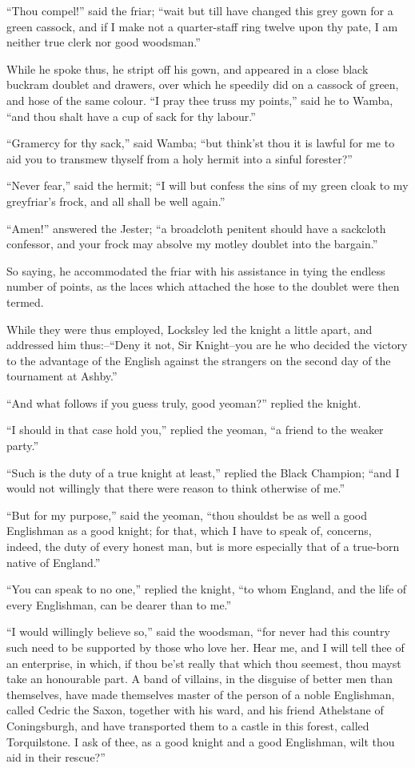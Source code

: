 ``Thou compel!'' said the friar; ``wait but till have changed this grey
gown for a green cassock, and if I make not a quarter-staff ring twelve
upon thy pate, I am neither true clerk nor good woodsman.''

While he spoke thus, he stript off his gown, and appeared in a close
black buckram doublet and drawers, over which he speedily did on a
cassock of green, and hose of the same colour. ``I pray thee truss my
points,'' said he to Wamba, ``and thou shalt have a cup of sack for thy
labour.''

``Gramercy for thy sack,'' said Wamba; ``but think'st thou it is lawful
for me to aid you to transmew thyself from a holy hermit into a sinful
forester?''

``Never fear,'' said the hermit; ``I will but confess the sins of my
green cloak to my greyfriar's frock, and all shall be well again.''

``Amen!'' answered the Jester; ``a broadcloth penitent should have a
sackcloth confessor, and your frock may absolve my motley doublet into
the bargain.''

So saying, he accommodated the friar with his assistance in tying the
endless number of points, as the laces which attached the hose to the
doublet were then termed.

While they were thus employed, Locksley led the knight a little apart,
and addressed him thus:--``Deny it not, Sir Knight--you are he who
decided the victory to the advantage of the English against the
strangers on the second day of the tournament at Ashby.''

``And what follows if you guess truly, good yeoman?'' replied the
knight.

``I should in that case hold you,'' replied the yeoman, ``a friend to
the weaker party.''

``Such is the duty of a true knight at least,'' replied the Black
Champion; ``and I would not willingly that there were reason to think
otherwise of me.''

``But for my purpose,'' said the yeoman, ``thou shouldst be as well a
good Englishman as a good knight; for that, which I have to speak of,
concerns, indeed, the duty of every honest man, but is more especially
that of a true-born native of England.''

``You can speak to no one,'' replied the knight, ``to whom England, and
the life of every Englishman, can be dearer than to me.''

``I would willingly believe so,'' said the woodsman, ``for never had
this country such need to be supported by those who love her. Hear me,
and I will tell thee of an enterprise, in which, if thou be'st really
that which thou seemest, thou mayst take an honourable part. A band of
villains, in the disguise of better men than themselves, have made
themselves master of the person of a noble Englishman, called Cedric the
Saxon, together with his ward, and his friend Athelstane of
Coningsburgh, and have transported them to a castle in this forest,
called Torquilstone. I ask of thee, as a good knight and a good
Englishman, wilt thou aid in their rescue?''

